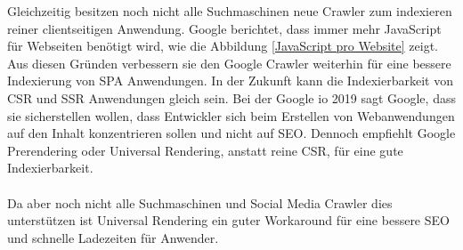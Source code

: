 \documentclass[runningheads]{llncs}
\begin{document}
Gleichzeitig besitzen noch nicht alle Suchmaschinen neue Crawler 
zum indexieren reiner clientseitigen Anwendung. 
Google berichtet, dass immer mehr JavaScript für Webseiten benötigt wird, 
wie die Abbildung \ref{JavaScript pro Website} zeigt. 
Aus diesen Gründen verbessern sie den Google Crawler weiterhin für eine bessere Indexierung von SPA Anwendungen. 
In der Zukunft kann die Indexierbarkeit von CSR und SSR Anwendungen gleich sein. 
Bei der Google io 2019 sagt Google, 
dass sie sicherstellen wollen, 
dass Entwickler sich beim Erstellen von Webanwendungen auf den Inhalt konzentrieren sollen und nicht auf SEO. 
Dennoch empfiehlt Google Prerendering oder Universal Rendering, 
anstatt reine CSR, für eine gute Indexierbarkeit.
\\
\\
Da aber noch nicht alle Suchmaschinen und 
Social Media Crawler dies unterstützen ist Universal Rendering ein 
guter Workaround für eine bessere SEO und schnelle Ladezeiten für Anwender.



\newpage
%


\end{document}
